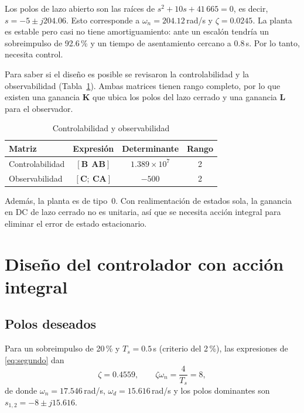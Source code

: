 \documentclass[conference,a4paper]{IEEEtran}
\begin{document}
Los polos de lazo abierto son las raíces de $s^2 + 10s + 41\,665 = 0$, es decir, $s = -5 \pm j204.06$. Esto corresponde a $\omega_n = 204.12$\,rad/s y $\zeta = 0.0245$. La planta es estable pero casi no tiene amortiguamiento: ante un escalón tendría un sobreimpulso de 92.6\,\% y un tiempo de asentamiento cercano a 0.8\,s. Por lo tanto, necesita control.

Para saber si el diseño es posible se revisaron la controlabilidad y la observabilidad (Tabla~\ref{tab:ctrb}). Ambas matrices tienen rango completo, por lo que existen una ganancia $\mathbf{K}$ que ubica los polos del lazo cerrado y una ganancia $\mathbf{L}$ para el observador.

\begin{table}[!t]
\centering
\caption{Controlabilidad y observabilidad}
\label{tab:ctrb}
\begin{tabular}{lccc}
\toprule
Matriz & Expresión & Determinante & Rango \\
\midrule
Controlabilidad & $[\mathbf{B}\ \ \mathbf{A}\mathbf{B}]$ & $1.389\times10^{7}$ & 2 \\
Observabilidad & $[\mathbf{C};\ \mathbf{C}\mathbf{A}]$ & $-500$ & 2 \\
\bottomrule
\end{tabular}
\end{table}

Además, la planta es de tipo~0. Con realimentación de estados sola, la ganancia en DC de lazo cerrado no es unitaria, así que se necesita acción integral para eliminar el error de estado estacionario.

\section{Diseño del controlador con acción integral}

\subsection{Polos deseados}
Para un sobreimpulso de 20\,\% y $T_s = 0.5$\,s (criterio del 2\,\%), las expresiones de \eqref{eq:segundo} dan
\begin{equation}
\zeta = 0.4559, \qquad \zeta\omega_n = \frac{4}{T_s} = 8,
\end{equation}
de donde $\omega_n = 17.546$\,rad/s, $\omega_d = 15.616$\,rad/s y los polos dominantes son $s_{1,2} = -8 \pm j15.616$.
\end{document}
